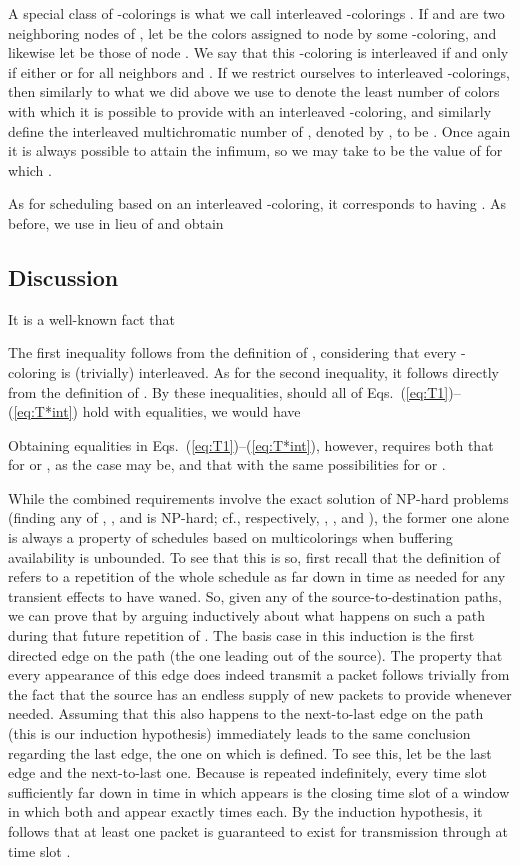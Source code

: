 \documentclass{article}
\begin{document}
A special class of -colorings is what we call interleaved -colorings
\cite{bg89,b00,yz05}. If  and  are two neighboring nodes of , let
 be the  colors assigned to node  by some
-coloring, and likewise let  be those of node .
We say that this -coloring is interleaved if and only if either
 or
 for all neighbors  and . If
we restrict ourselves to interleaved -colorings, then similarly to what we
did above we use  to denote the least number of colors
with which it is possible to provide  with an interleaved -coloring, and
similarly define the interleaved multichromatic number of , denoted by
, to be
. Once again it is
always possible to attain the infimum, so we may take  to be the value of
 for which .

As for scheduling based on an interleaved -coloring, it corresponds to having
. As before, we use
 in lieu of  and obtain


\subsection{Discussion}

It is a well-known fact that

The first inequality follows from the definition of ,
considering that every -coloring is (trivially) interleaved. As for the
second inequality, it follows directly from the definition of . By
these inequalities, should all of Eqs.~(\ref{eq:T1})--(\ref{eq:T*int}) hold with
equalities, we would have

Obtaining equalities in Eqs.~(\ref{eq:T1})--(\ref{eq:T*int}), however, requires
both that  for  or , as the
case may be, and that  with the same
possibilities for  or
.

While the combined requirements involve the exact solution of NP-hard problems
(finding any of , , and  is
NP-hard; cf., respectively, \cite{k72}, \cite{bg89}, and \cite{gls81}), the
former one alone is always a property of schedules based on multicolorings when
buffering availability is unbounded. To see that this is so, first recall that
the definition of  refers to a repetition of
the whole schedule as far down in time as needed for any transient effects to
have waned. So, given any of the  source-to-destination paths, we can prove
that  by arguing inductively about what
happens on such a path during that future repetition of . The basis
case in this induction is the first directed edge on the path (the one leading
out of the source). The property that every appearance of this edge does indeed
transmit a packet follows trivially from the fact that the source has an endless
supply of new packets to provide whenever needed. Assuming that this also
happens to the next-to-last edge on the path (this is our induction hypothesis)
immediately leads to the same conclusion regarding the last edge, the one on
which  is defined. To see this, let  be the
last edge and  the next-to-last one. Because  is repeated
indefinitely, every time slot  sufficiently far down in time in which 
appears is the closing time slot of a window in which both  and  appear
exactly  times each. By the induction hypothesis, it follows that at least
one packet is guaranteed to exist for transmission through  at time slot .
\end{document}
